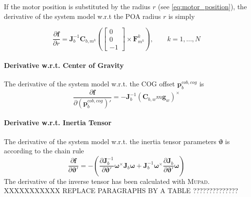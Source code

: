 If the motor position is substituted by the radius $r$ (see \cref{eq:motor_position}), the derivative of the system model w.r.t the POA radius $r$ is simply

\begin{equation}
\frac{\partial \mathbf{f}}{\partial r} =
\mathbf{J}_b^{-1} 
\mathbf{C}_{b,m^k}
\left(
\left[ \begin{array}{c}
0 \\
0 \\
-1
\end{array} \right]
\times
\mathbf{F}^k_{m^k} \right)
, \qquad k = 1,...,N
\end{equation}

\paragraph{Derivative w.r.t. Center of Gravity\\}
The derivative of the system model w.r.t. the COG offset $\mathbf{p}^{cob,cog}_{b}$ is
\begin{equation}
\frac{\partial \mathbf{f}}{\partial (\mathbf{p}^{cob,cog}_{b})'} =
-
\mathbf{J}_b^{-1} 
\left( \mathbf{C}_{b,w} m \mathbf{g}_w \right) ^\times
\end{equation}

\paragraph{Derivative w.r.t. Inertia Tensor\\}
The derivative of the system model w.r.t. the inertia tensor parameters $\boldsymbol{\vartheta}$ is
according to the chain rule
\begin{equation}
\frac{\partial \mathbf{f}}{\partial \boldsymbol{\vartheta}'} =
-
\left(
\frac{\partial \mathbf{J}_b^{-1}}{\partial \boldsymbol{\vartheta}'}
\boldsymbol{\omega} ^\times \mathbf{J}_b \boldsymbol{\omega}
+
\mathbf{J}_b^{-1}
\boldsymbol{\omega} ^\times \frac{\partial \mathbf{J}_b}{\partial \boldsymbol{\vartheta}'} \boldsymbol{\omega}
\right)
\end{equation}
The derivative of the inverse tensor has been calculated with \textsc{Mupad}.
\\

XXXXXXXXXXX REPLACE PARAGRAPHS BY A TABLE ??????????????

